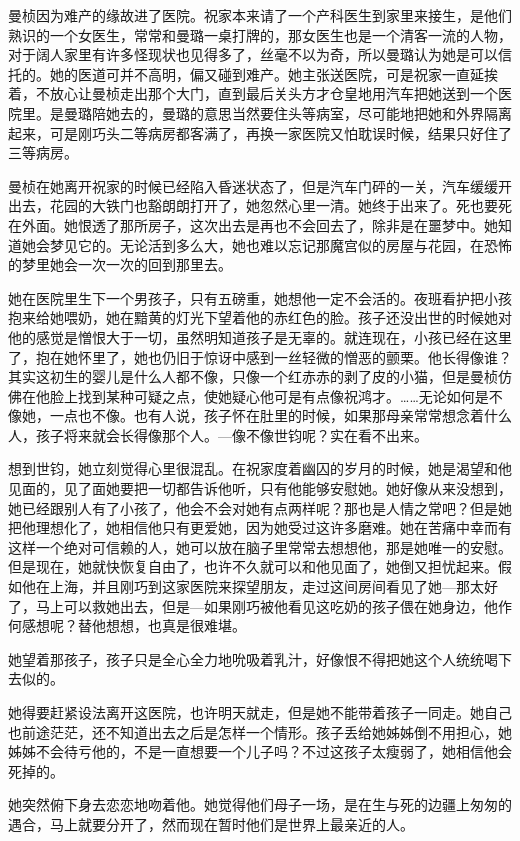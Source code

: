 \par 曼桢因为难产的缘故进了医院。祝家本来请了一个产科医生到家里来接生，是他们熟识的一个女医生，常常和曼璐一桌打牌的，那女医生也是一个清客一流的人物，对于阔人家里有许多怪现状也见得多了，丝毫不以为奇，所以曼璐认为她是可以信托的。她的医道可并不高明，偏又碰到难产。她主张送医院，可是祝家一直延挨着，不放心让曼桢走出那个大门，直到最后关头方才仓皇地用汽车把她送到一个医院里。是曼璐陪她去的，曼璐的意思当然要住头等病室，尽可能地把她和外界隔离起来，可是刚巧头二等病房都客满了，再换一家医院又怕耽误时候，结果只好住了三等病房。
\par 曼桢在她离开祝家的时候已经陷入昏迷状态了，但是汽车门砰的一关，汽车缓缓开出去，花园的大铁门也豁朗朗打开了，她忽然心里一清。她终于出来了。死也要死在外面。她恨透了那所房子，这次出去是再也不会回去了，除非是在噩梦中。她知道她会梦见它的。无论活到多么大，她也难以忘记那魔宫似的房屋与花园，在恐怖的梦里她会一次一次的回到那里去。
\par 她在医院里生下一个男孩子，只有五磅重，她想他一定不会活的。夜班看护把小孩抱来给她喂奶，她在黯黄的灯光下望着他的赤红色的脸。孩子还没出世的时候她对他的感觉是憎恨大于一切，虽然明知道孩子是无辜的。就连现在，小孩已经在这里了，抱在她怀里了，她也仍旧于惊讶中感到一丝轻微的憎恶的颤栗。他长得像谁？其实这初生的婴儿是什么人都不像，只像一个红赤赤的剥了皮的小猫，但是曼桢仿佛在他脸上找到某种可疑之点，使她疑心他可是有点像祝鸿才。……无论如何是不像她，一点也不像。也有人说，孩子怀在肚里的时候，如果那母亲常常想念着什么人，孩子将来就会长得像那个人。—像不像世钧呢？实在看不出来。
\par 想到世钧，她立刻觉得心里很混乱。在祝家度着幽囚的岁月的时候，她是渴望和他见面的，见了面她要把一切都告诉他听，只有他能够安慰她。她好像从来没想到，她已经跟别人有了小孩了，他会不会对她有点两样呢？那也是人情之常吧？但是她把他理想化了，她相信他只有更爱她，因为她受过这许多磨难。她在苦痛中幸而有这样一个绝对可信赖的人，她可以放在脑子里常常去想想他，那是她唯一的安慰。但是现在，她就快恢复自由了，也许不久就可以和他见面了，她倒又担忧起来。假如他在上海，并且刚巧到这家医院来探望朋友，走过这间房间看见了她—那太好了，马上可以救她出去，但是—如果刚巧被他看见这吃奶的孩子偎在她身边，他作何感想呢？替他想想，也真是很难堪。
\par 她望着那孩子，孩子只是全心全力地吮吸着乳汁，好像恨不得把她这个人统统喝下去似的。
\par 她得要赶紧设法离开这医院，也许明天就走，但是她不能带着孩子一同走。她自己也前途茫茫，还不知道出去之后是怎样一个情形。孩子丢给她姊姊倒不用担心，她姊姊不会待亏他的，不是一直想要一个儿子吗？不过这孩子太瘦弱了，她相信他会死掉的。
\par 她突然俯下身去恋恋地吻着他。她觉得他们母子一场，是在生与死的边疆上匆匆的遇合，马上就要分开了，然而现在暂时他们是世界上最亲近的人。
